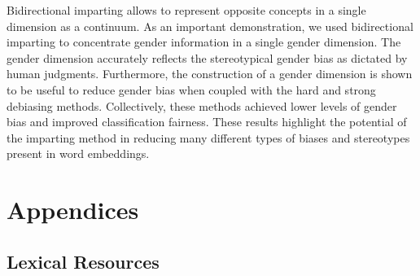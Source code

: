 \documentclass[11pt,a4paper]{article}
\begin{document}
Bidirectional imparting allows to represent opposite concepts in a single dimension as a continuum. As an important demonstration, we used bidirectional imparting to concentrate gender information in a single gender dimension. The gender dimension accurately reflects the stereotypical gender bias as dictated by human judgments. Furthermore, the construction of a gender dimension is shown to be useful to reduce gender bias when coupled with the hard and strong debiasing methods. Collectively, these methods achieved lower levels of gender bias and improved classification fairness. These results highlight the potential of the imparting method in reducing many different types of biases and stereotypes present in word embeddings.






\clearpage

\appendix

\section{Appendices}



\subsection{Lexical Resources} 
\label{app:lexical_resources}
\end{document}
